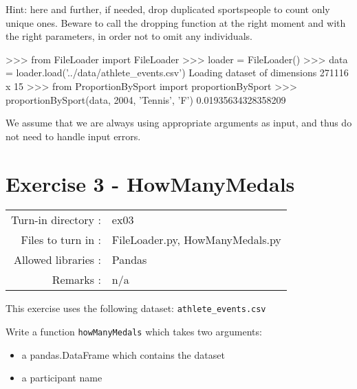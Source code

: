 \documentclass[]{article}
\newenvironment{Shaded}{\begin{snugshade}}{\end{snugshade}}
\newcommand{\DecValTok}[1]{\textcolor[rgb]{0.96,0.45,0.00}{#1}}
\newcommand{\FloatTok}[1]{\textcolor[rgb]{0.96,0.45,0.00}{#1}}
\newcommand{\ImportTok}[1]{\textcolor[rgb]{0.15,0.68,0.38}{#1}}
\newcommand{\NormalTok}[1]{\textcolor[rgb]{0.81,0.81,0.76}{#1}}
\newcommand{\OperatorTok}[1]{\textcolor[rgb]{0.81,0.81,0.76}{#1}}
\newcommand{\StringTok}[1]{\textcolor[rgb]{0.96,0.31,0.31}{#1}}
\begin{document}
Hint: here and further, if needed, drop duplicated sportspeople to count
only unique ones. Beware to call the dropping function at the right
moment and with the right parameters, in order not to omit any
individuals.

\begin{Shaded}
\begin{Highlighting}[]
\OperatorTok{>>>} \ImportTok{from}\NormalTok{ FileLoader }\ImportTok{import}\NormalTok{ FileLoader}
\OperatorTok{>>>}\NormalTok{ loader }\OperatorTok{=}\NormalTok{ FileLoader()}
\OperatorTok{>>>}\NormalTok{ data }\OperatorTok{=}\NormalTok{ loader.load(}\StringTok{'../data/athlete_events.csv'}\NormalTok{)}
\NormalTok{Loading dataset of dimensions }\DecValTok{271116}\NormalTok{ x }\DecValTok{15}
\OperatorTok{>>>} \ImportTok{from}\NormalTok{ ProportionBySport }\ImportTok{import}\NormalTok{ proportionBySport}
\OperatorTok{>>>}\NormalTok{ proportionBySport(data, }\DecValTok{2004}\NormalTok{, }\StringTok{'Tennis'}\NormalTok{, }\StringTok{'F'}\NormalTok{)}
\FloatTok{0.01935634328358209}
\end{Highlighting}
\end{Shaded}

We assume that we are always using appropriate arguments as input, and
thus do not need to handle input errors.

\clearpage

\hypertarget{exercise-3---howmanymedals}{%
\section{Exercise 3 - HowManyMedals}\label{exercise-3---howmanymedals}}

\begin{longtable}[]{@{}rl@{}}
\toprule
\endhead
Turn-in directory : & ex03\tabularnewline
Files to turn in : & FileLoader.py, HowManyMedals.py\tabularnewline
Allowed libraries : & Pandas\tabularnewline
Remarks : & n/a\tabularnewline
\bottomrule
\end{longtable}

This exercise uses the following dataset: \texttt{athlete\_events.csv}

Write a function \texttt{howManyMedals} which takes two arguments:

\begin{itemize}
\item
  a pandas.DataFrame which contains the dataset
\item
  a participant name
\end{itemize}
\end{document}
